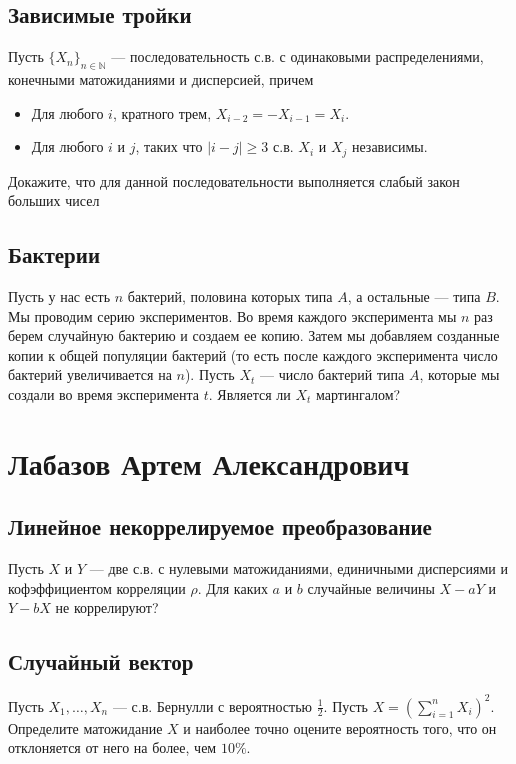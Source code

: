 \documentclass[12pt]{article}
\newcommand\N{\mathbb{N}}
\begin{document}
\subsection{Зависимые тройки}
Пусть $\{X_n\}_{n \in \N}$ --- последовательность с.в. с одинаковыми распределениями, конечными матожиданиями и дисперсией, причем
\begin{itemize}
    \item Для любого $i$, кратного трем, $X_{i - 2} = - X_{i - 1} = X_{i}$. 
    \item Для любого $i$ и $j$, таких что $|i - j| \ge 3$ с.в. $X_i$ и $X_j$ независимы.
\end{itemize}
Докажите, что для данной последовательности выполняется слабый закон больших чисел


\subsection{Бактерии}

Пусть у нас есть $n$ бактерий, половина которых типа $A$, а остальные --- типа $B$. Мы проводим серию экспериментов. Во время каждого эксперимента мы $n$ раз берем случайную бактерию и создаем ее копию. Затем мы добавляем созданные копии к общей популяции бактерий (то есть после каждого эксперимента число бактерий увеличивается на $n$). Пусть $X_t$ --- число бактерий типа $A$, которые мы создали во время эксперимента $t$. Является ли $X_t$ мартингалом?


\newpage
\section{Лабазов Артем Александрович}

\subsection{Линейное некоррелируемое преобразование}

Пусть $X$ и $Y$ --- две с.в. с нулевыми матожиданиями, единичными дисперсиями и кофэффициентом корреляции $\rho$. Для каких $a$ и $b$ случайные величины $X - aY$ и $Y - bX$ не коррелируют?


\subsection{Случайный вектор}

Пусть $X_1, \dots, X_n$ --- с.в. Бернулли с вероятностью $\frac{1}{2}$. Пусть $X = (\sum_{i = 1}^n X_i)^2$. Определите матожидание $X$ и наиболее точно оцените вероятность того, что он отклоняется от него на более, чем $10\%$.
\end{document}
